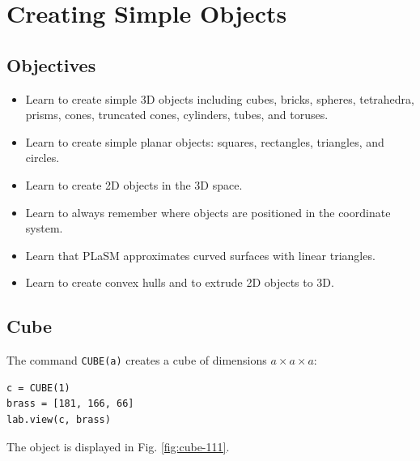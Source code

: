 \section{Creating Simple Objects}

\subsection{Objectives}
\begin{itemize}
\item Learn to create simple 3D objects including cubes, bricks, spheres,  
      tetrahedra, prisms, cones, truncated cones, cylinders, tubes, and toruses. 
\item Learn to create simple planar objects: squares, rectangles, triangles, and circles. 
\item Learn to create 2D objects in the 3D space. 
\item Learn to always remember where objects are positioned in the coordinate system.
\item Learn that PLaSM approximates curved surfaces with linear triangles.
\item Learn to create convex hulls and to extrude 2D objects to 3D.
\end{itemize}
\vspace{4mm}


\subsection{Cube}\label{subsec:cube}

The command {\tt CUBE(a)} creates a cube of dimensions $a \times a \times a$:\\

\begin{bbox}
\begin{verbatim}
c = CUBE(1)
brass = [181, 166, 66]
lab.view(c, brass)
\end{verbatim}
\end{bbox}
\vspace{6mm}

\noindent
The object is displayed in Fig. \ref{fig:cube-111}. 

